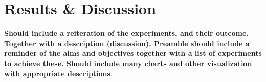 \chapter{Results \& Discussion}
\textbf{Should include a reiteration of the experiments, and their outcome.  Together with a description (discussion).  Preamble should include a reminder of the aims and objectives together with a list of experiments to achieve these.  Should include many charts and other visualization with appropriate descriptions}.  

